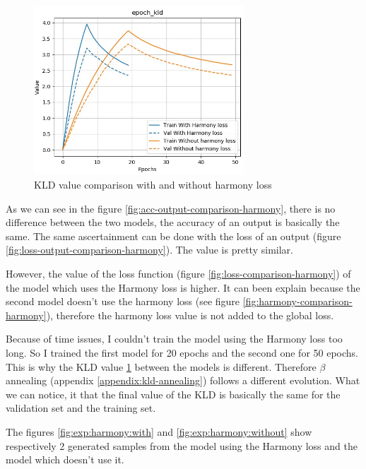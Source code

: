 \documentclass[12pt]{report}
\begin{document}
\begin{figure}[htbp]
    \centering
    \includegraphics[width=0.7\textwidth]{images/experiences/harmony-rnn/kld-comparison-harmony.jpg}
    \caption{KLD value comparison with and without harmony loss}
    \label{fig:kld-comparison-harmony}
\end{figure}

As we can see in the figure \ref{fig:acc-output-comparison-harmony}, there is no difference between the two models, the accuracy of an output is basically the same.
The same ascertainment can be done with the loss of an output (figure \ref{fig:loss-output-comparison-harmony}).
The value is pretty similar.

However, the value of the loss function (figure \ref{fig:loss-comparison-harmony}) of the model which uses the Harmony loss is higher.
It can been explain because the second model doesn't use the harmony loss (see figure \ref{fig:harmony-comparison-harmony}), therefore the harmony loss value is not added to the global loss.

Because of time issues, I couldn't train the model using the Harmony loss too long.
So I trained the first model for 20 epochs and the second one for 50 epochs.
This is why the KLD value \ref{fig:kld-comparison-harmony} between the models is different.
Therefore $\beta$ annealing (appendix \ref{appendix:kld-annealing}) follows a different evolution.
What we can notice, it that the final value of the KLD is basically the same for the validation set and the training set.



The figures \ref{fig:exp:harmony:with} and \ref{fig:exp:harmony:without} show respectively 2 generated samples from the model using the Harmony loss and the model which doesn't use it.
\end{document}
